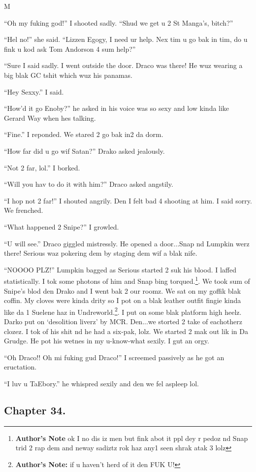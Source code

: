 M\documentclass{article}
\begin{document}
“Oh my fuking god!” I shooted sadly. “Shud we get u 2 St Manga’s, bitch?”

“Hel no!” she said. “Lizzen Egogy, I need ur help. Nex tim u go bak in tim, do u fink u kod ask Tom Andorson 4 sum help?”

“Sure I said sadly. I went outside the door. Draco was there! He wuz wearing a big blak GC tshit which wuz his panamas.

“Hey Sexxy.” I said.

“How’d it go Enoby?” he asked in his voice was so sexy and low kinda like Gerard Way when hes talking.

“Fine.” I reponded. We stared 2 go bak in2 da dorm.

“How far did u go wif Satan?” Drako asked jealously.

“Not 2 far, lol.” I borked.

“Will you hav to do it with him?” Draco asked angstily.

“I hop not 2 far!” I shouted angrily. Den I felt bad 4 shooting at him. I said sorry. We frenched.

“What happened 2 Snipe?” I growled.

“U will see.” Draco giggled mistressly. He opened a door...Snap nd Lumpkin werz there! Serious waz pokering dem by staging dem wif a blak nife.

“NOOOO PLZ!” Lumpkin bagged as Serious started 2 suk his blood. I laffed statistically. I tok some photons of him and Snap bing torqued.\footnote{\textbf{Author's Note }ok I no dis iz men but fink abot it ppl dey r pedoz nd Snap trid 2 rap dem and neway sadiztz rok haz any1 seen shrak atak 3 lolz}. We took sum of Snipe’s blod den Drako and I went bak 2 our roomz. We sat on my goffik blak coffin. My cloves were kinda drity so I pot on a blak leather outfit fingie kinda like da 1 Suelene haz in Undreworld.\footnote{\textbf{Author's Note: }if u haven’t herd of it den FUK U!}. I put on some blak platform high heelz. Darko put on ‘desolition liverz’ by MCR. Den...we storted 2 take of eachotherz clozez. I tok of his shit nd he had a six-pak, lolz. We started 2 mak out lik in Da Grudge. He pot his wetnes in my u-know-what sexily. I gut an orgy.

“Oh Draco!! Oh mi fuking gud Draco!” I screemed passively as he got an eructation.

“I luv u TaEbory.” he whispred sexily and den we fel aspleep lol.

\clearpage\nolinenumbers
\subsection*{Chapter 34.}
\end{document}
